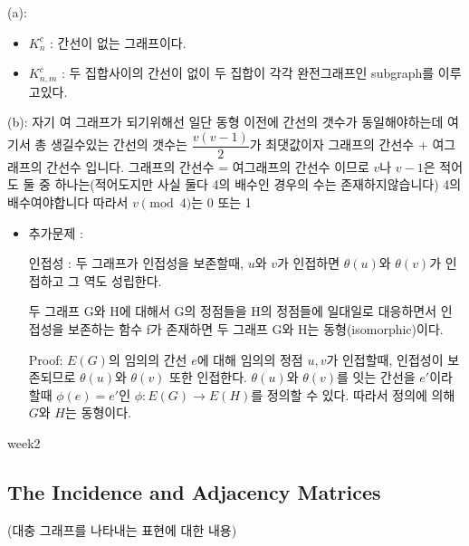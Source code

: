 \subsubsection{}
\subsubsection{}
(a):
\begin{itemize}
    \item $K_{n}^{c}$ : 간선이 없는 그래프이다.
    \item $K_{n,m}^{c}$ : 두 집합사이의 간선이 없이 두 집합이 각각 완전그래프인 subgraph를 이루고있다.
\end{itemize}
(b): 자기 여 그래프가 되기위해선 일단 동형 이전에 간선의 갯수가 동일해야하는데 여기서 총 생길수있는 간선의 갯수는 $\dfrac{v(v-1)}{2}$가 최댓값이자 그래프의 간선수 + 여그래프의 간선수 입니다. 그래프의 간선수 = 여그래프의 간선수 이므로 $v$나 $v-1$은 적어도 둘 중 하나는(적어도지만 사실 둘다 4의 배수인 경우의 수는 존재하지않습니다) 4의 배수여야합니다 따라서 $v\pmod{4}$는 0 또는 1


\begin{itemize}
\item 추가문제 :

인접성 : 두 그래프가 인접성을 보존할때, $u$와 $v$가 인접하면 $\theta(u)$와  $\theta(v)$가 인접하고 그 역도 성립한다. 

두 그래프 G와 H에 대해서 G의 정점들을 H의 정점들에 일대일로 대응하면서 
인접성을 보존하는 함수 f가 존재하면 두 그래프 G와 H는 동형(isomorphic)이다.

Proof: $E(G)$의 임의의 간선 $e$에 대해 임의의 정점 $u,v$가 인접할때, 인접성이 보존되므로 $\theta(u)$와  $\theta(v)$ 또한 인접한다.
$\theta(u)$와  $\theta(v)$를 잇는 간선을 $e'$이라 할때 $\phi(e) = e'$인 $\phi: E(G) \longrightarrow E(H)$를 정의할 수 있다.
따라서 정의에 의해 $G$와 $H$는 동형이다.
\end{itemize}

week2

\subsection{The Incidence and Adjacency Matrices}
(대충 그래프를 나타내는 표현에 대한 내용)
